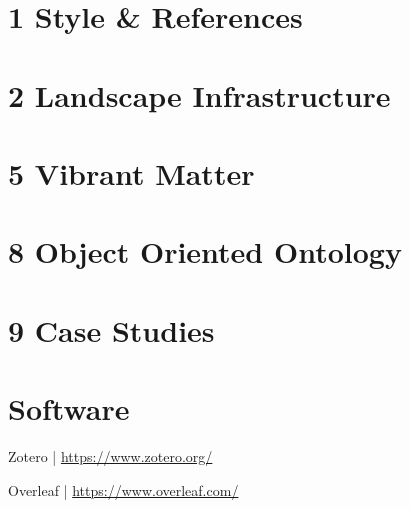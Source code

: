 \documentclass[11pt,article,oneside]{memoir}
\begin{document}

\section{1 Style \& References}
\nocite{*}
\setlength{}
\printbibliography[keyword=style, heading=none]

\section{2 Landscape Infrastructure}
\nocite{*}
\setlength{}
\printbibliography[keyword=infrastructure, heading=none]


\section{5 Vibrant Matter}
\nocite{*}
\setlength{}
\printbibliography[keyword=matter, heading=none]

\section{8 Object Oriented Ontology}
\nocite{*}
\setlength{}
\printbibliography[keyword=ooo, heading=none]

\section{9 Case Studies}
\nocite{*}
\setlength{}
\printbibliography[keyword=case-studies, heading=none]



\section{Software}
\vspace*{1em}
\begin{minipage}{0.48\textwidth}
Zotero | \url{https://www.zotero.org/}\\
\end{minipage}
\hfill
\begin{minipage}{0.48\textwidth}
Overleaf | \url{https://www.overleaf.com/}\\
\end{minipage}
\end{document}

